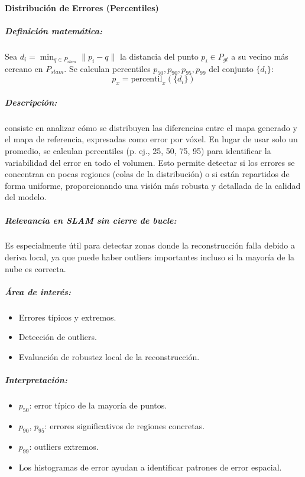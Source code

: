 \documentclass[12pt, a4paper, twoside]{article}
\begin{document}
\paragraph{Distribución de Errores (Percentiles)}

\subparagraph{Definición matemática:}
Sea $d_i = \min_{q \in P_{slam}} \|p_i - q\|$ la distancia del punto $p_i \in P_{gt}$ a su vecino más cercano en $P_{slam}$.  
Se calculan percentiles $p_{50}, p_{90}, p_{95}, p_{99}$ del conjunto $\{d_i\}$:
\[
p_x = \text{percentil}_x(\{ d_i \})
\]

\subparagraph{Descripción:}
consiste en analizar cómo se distribuyen las diferencias entre el mapa generado y el mapa de referencia, expresadas como error por vóxel.
 En lugar de usar solo un promedio, se calculan percentiles (p. ej., 25, 50, 75, 95) para identificar la variabilidad del error en todo el 
 volumen. Esto permite detectar si los errores se concentran en pocas regiones (colas de la distribución) o si están repartidos de forma 
 uniforme, proporcionando una visión más robusta y detallada de la calidad del modelo.
\newpage
\subparagraph{Relevancia en SLAM\cite{smith1987slam} sin cierre de bucle:}
Es especialmente útil para detectar zonas donde la reconstrucción falla debido a deriva local, ya que puede haber outliers 
importantes incluso si la mayoría de la nube es correcta.
\subparagraph{Área de interés:}
\begin{itemize}
  \item Errores típicos y extremos.
  \item Detección de outliers.
  \item Evaluación de robustez local de la reconstrucción.
\end{itemize}

\subparagraph{Interpretación:}
\begin{itemize}
  \item $p_{50}$: error típico de la mayoría de puntos.  
  \item $p_{90}$, $p_{95}$: errores significativos de regiones concretas.  
  \item $p_{99}$: outliers extremos.  
  \item Los histogramas de error ayudan a identificar patrones de error espacial.
\end{itemize}
\end{document}
